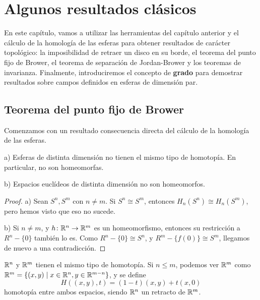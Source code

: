 \chapter{Algunos resultados clásicos}\label{ch:resultados}

En este capítulo, vamos a utilizar las herramientas del capítulo anterior y el cálculo
de la homología de las esferas para obtener resultados de carácter topológico: la
imposibilidad de retraer un disco en su borde, el teorema del punto fijo de Brower,
el teorema de separación de Jordan-Brower y los teoremas de invarianza. Finalmente,
introduciremos el concepto de \textbf{grado} para demostrar resultados sobre campos
definidos en esferas de dimensión par.

\section{Teorema del punto fijo de Brower}

Comenzamos con un resultado consecuencia directa del cálculo de la homología de las esferas.

\begin{proposition}
  a) Esferas de distinta dimensión no tienen el mismo tipo de homotopía. En particular, no son homeomorfas.

  b) Espacios euclídeos de distinta dimensión no son homeomorfos.
\end{proposition}

\begin{proof}
  a) Sean $S^n, S^m$ con $n \neq m$. Si $S^n \cong S^m$, entonces $H_n(S^n) \cong H_n(S^m)$, pero hemos visto que eso no sucede.

  b) Si $n \neq m$, y $h \colon \mathbb{R}^n \to \mathbb{R}^m$ es un homeomorfismo, entonces su restricción a $R^n - \{0\}$ también lo es.
  Como $R^n - \{0\} \cong S^n$, y $R^m - \{f(0)\} \cong S^m$, llegamos de nuevo a una contradicción.
\end{proof}

\begin{remark}
  $\mathbb{R}^n$ y $\mathbb{R}^m$ tienen el mismo tipo de homotopía. Si $n \leq m$, podemos ver $\mathbb{R}^m$ como \\
  $\mathbb{R}^m = \{(x, y) \mid x \in \mathbb{R}^n, y \in \mathbb{R}^{m-n}\}$, y se define
  \[ H((x, y), t) = (1-t)(x, y) + t(x, 0) \]
  homotopía entre ambos espacios, siendo $\mathbb{R}^n$ un retracto de $\mathbb{R}^m$.
\end{remark}

